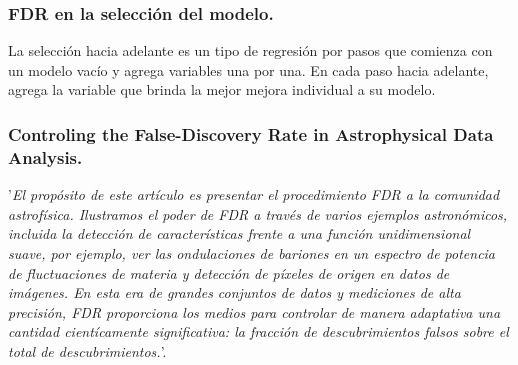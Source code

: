 \documentclass[11pt,letterpaper]{article}
\begin{document}
\subsubsection*{FDR en la selección del modelo.}
La selección hacia adelante es un tipo de regresión por pasos que comienza con un modelo vacío y agrega variables una por una. En cada paso hacia adelante, agrega la variable que brinda la mejor mejora individual a su modelo.

\subsubsection*{Controling the False-Discovery Rate in Astrophysical Data Analysis.} 

'\textit{El propósito de este artículo es presentar el procedimiento FDR a la comunidad astrofísica. Ilustramos el poder de FDR a través de varios ejemplos astronómicos, incluida la detección de características frente a una función unidimensional suave, por ejemplo, ver las \textit{ondulaciones de bariones} en un espectro de potencia de fluctuaciones de materia y detección de píxeles de origen en datos de imágenes. En esta era de grandes conjuntos de datos y mediciones de alta precisión, FDR proporciona los medios para controlar de manera adaptativa una cantidad cientícamente significativa: la fracción de descubrimientos falsos sobre el total de descubrimientos.}'.
\end{document}
